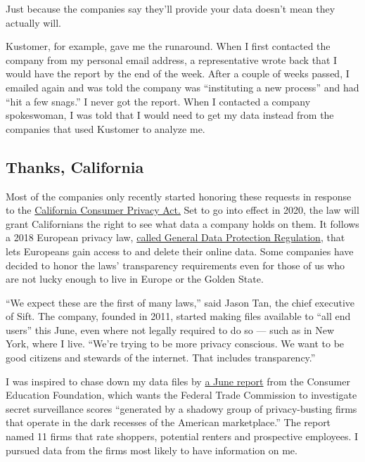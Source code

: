 Just because the companies say they'll provide your data doesn't mean
they actually will.

Kustomer, for example, gave me the runaround. When I first contacted the
company from my personal email address, a representative wrote back that
I would have the report by the end of the week. After a couple of weeks
passed, I emailed again and was told the company was ``instituting a new
process'' and had ``hit a few snags.'' I never got the report. When I
contacted a company spokeswoman, I was told that I would need to get my
data instead from the companies that used Kustomer to analyze me.

\hypertarget{thanks-california}{%
\subsection{Thanks, California}\label{thanks-california}}

Most of the companies only recently started honoring these requests in
response to the
\href{https://www.nytimes3xbfgragh.onion/2018/06/28/technology/california-online-privacy-law.html}{California
Consumer Privacy Act.} Set to go into effect in 2020, the law will grant
Californians the right to see what data a company holds on them. It
follows a 2018 European privacy law,
\href{https://www.nytimes3xbfgragh.onion/2018/05/24/technology/europe-gdpr-privacy.html}{called
General Data Protection Regulation}, that lets Europeans gain access to
and delete their online data. Some companies have decided to honor the
laws' transparency requirements even for those of us who are not lucky
enough to live in Europe or the Golden State.

``We expect these are the first of many laws,'' said Jason Tan, the
chief executive of Sift. The company, founded in 2011, started making
files available to ``all end users'' this June, even where not legally
required to do so --- such as in New York, where I live. ``We're trying
to be more privacy conscious. We want to be good citizens and stewards
of the internet. That includes transparency.''

I was inspired to chase down my data files by
\href{https://www.representconsumers.org/wp-content/uploads/2019/06/2019.06.24-FTC-Letter-Surveillance-Scores.pdf}{a
June report} from the Consumer Education Foundation, which wants the
Federal Trade Commission to investigate secret surveillance scores
``generated by a shadowy group of privacy-busting firms that operate in
the dark recesses of the American marketplace.'' The report named 11
firms that rate shoppers, potential renters and prospective employees. I
pursued data from the firms most likely to have information on me.

